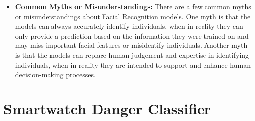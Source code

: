 \begin{itemize}
    \item \textbf{Common Myths or Misunderstandings:} There are a few common myths or misunderstandings about Facial Recognition models. One myth is that the models can always accurately identify individuals, when in reality they can only provide a prediction based on the information they were trained on and may miss important facial features or misidentify individuals. Another myth is that the models can replace human judgement and expertise in identifying individuals, when in reality they are intended to support and enhance human decision-making processes.
\end{itemize}

\section{Smartwatch Danger Classifier} 

